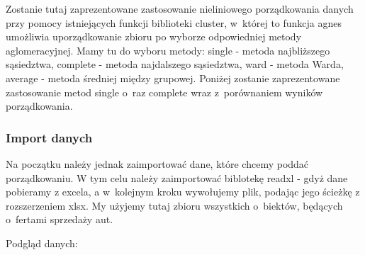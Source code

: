 \documentclass[12pt,a4paper]{report}
\begin{document}
{%


Zostanie tutaj zaprezentowane zastosowanie nieliniowego porządkowania
danych przy pomocy istniejących funkcji biblioteki cluster, w~której to
funkcja agnes umożliwia uporządkowanie zbioru po wyborze
odpowiedniej metody aglomeracyjnej. Mamy tu do wyboru metody: single -
metoda najbliższego sąsiedztwa, complete - metoda najdalszego
sąsiedztwa, ward - metoda Warda, average - metoda średniej między
grupowej. Poniżej zostanie zaprezentowane zastosowanie metod single o~raz
complete wraz z~porównaniem wyników porządkowania.

\subsubsection{Import danych}\label{import-danych}

Na początku należy jednak zaimportować dane, które chcemy poddać porządkowaniu.
W tym celu należy zaimportować biblotekę readxl - gdyż dane pobieramy z
excela, a w~kolejnym kroku wywołujemy plik, podając jego ścieżkę 
z rozszerzeniem xlsx. My użyjemy tutaj zbioru wszystkich o~biektów,
będących o~fertami sprzedaży aut.

\begin{Shaded}
\begin{Highlighting}[]
\StringTok{ }\NormalTok{(}\NormalTok{, }
                            \NormalTok{)}
\end{Highlighting}
\end{Shaded}

Podgląd danych:

\begin{Shaded}
\begin{Highlighting}[]
\end{Highlighting}
\end{Shaded}

}
\end{document}
